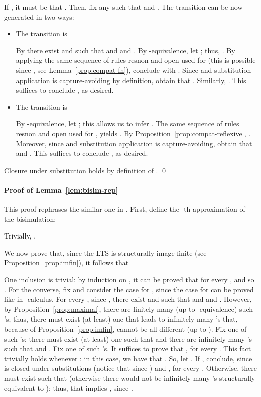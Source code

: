 \documentclass{LMCS}
\begin{document}
\noindent If , it must be that .
Then, fix any  such that  and .
The transition  can be now generated in two ways:
\begin{itemize}
\item The transition is
	
	By  there exist  and  such that  and
	 and . By -equivalence,
	let ; thus, .
	By applying the same sequence of rules {\sf resnon} and {\sf open} used for 
	(this is possible since , see Lemma~\ref{prop:compat-fn}), 
	conclude with .
	Since  and
	substitution application is capture-avoiding by definition, obtain that .
	Similarly, .
	This suffices to conclude , as desired.
\item The transition is
	
	By -equivalence, let ;
	this allows us to infer . The same sequence of
	rules {\sf resnon} and {\sf open} used for , yields
	.
	By Proposition~\ref{prop:compat-reflexive}, . Moreover, 
	since  and
	substitution application is capture-avoiding, obtain that  and
	.
	This suffices to conclude , as desired.
\end{itemize}
Closure under substitution holds by definition of .
\qed

\paragraph{Proof of Lemma~\ref{lem:bisim-rep}}
This proof rephrases the similar one in \cite{sangiorgi.walker:theory-mobile}. 
First, define the -th approximation of the bisimulation:

Trivially, .

We now prove that, since the LTS is structurally image finite (see Proposition~\ref{prop:imfin}),
it follows that

One inclusion is trivial: by induction on , it can be proved that  for every ,
and so .
For the converse, fix  and consider the case for , since
the case for  can be proved like in -calculus. For every , since , 
there exist  and  such that  and 
and . However, by Proposition~\ref{prop:maximal}, 
there are finitely many (up-to -equivalence) such 's; thus, there must exist
(at least) one  that leads to infinitely many 's that, because of Proposition~\ref{prop:imfin},
cannot be all different (up-to ). Fix one of such 's; there must exist (at least) one  
such that  and there are infinitely many 's such that 
 and . Fix one of such 's. It suffices to prove that
, for every . This fact trivially holds whenever :
in this case, we have that . So, let . If ,
conclude, since  is closed under substitutions (notice that  since
) and , for every . 
Otherwise, there must exist  such that  
(otherwise there would not be infinitely many 's structurally equivalent to ): 
thus,  that implies , since .
\end{document}
